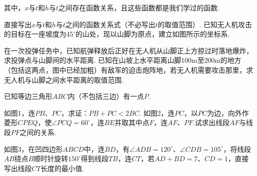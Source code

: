 \documentclass[10pt]{article}
\begin{document}
\begin{questions}{\answeringintroduction}
\begin{figure}[!htb]
{}
    \end{figure}
    \par 其中，$x$与$t$和$h$与$t$之间存在函数关系，且这些函数都是我们学过的函数.
    \begin{subquestions}
        \subquestion 直接写出$x$与$t$和$h$与$t$之间的函数关系式（不必写出$t$的取值范围）.
        \subquestion 已知无人机攻击的目标在一座坡度为$45^{\circ}$的山处，现以山脚为原点，建立如图所示的坐标系.
        \begin{subsubquestions}
            \subsubquestion 在一次投弹任务中，已知航弹释放后正好在无人机从山脚正上方掠过时落地爆炸，求投弹点与山脚间的水平距离.
            \subsubquestion 已知在山坡上水平距离山脚$100$m至$200$m的地方（包括这两点，图中已经加粗）有敌军的迫击炮阵地，若无人机需要攻击那里，求无人机与山脚之间水平距离的取值范围.
        \end{subsubquestions}
    \end{subquestions}
    \newpage
    \question %
    \begin{subquestions}
        \subquestion 已知等边三角形$ABC$内（不包括三边）有一点$P$.
        \begin{subsubquestions}
            \subsubquestion 如图1，连$PB$、$PC$，求证：$PB+PC<2BC$.
            \subsubquestion 如图2，连$PC$，以$PC$为边，向外作菱形$CPEQ$，使$\angle PCQ=60^{\circ}$，连$BE$并取其中点$F$，连$AF$、$PF$.试求出线段$AF$与线段$PF$之间的关系.
        \end{subsubquestions}
        \subquestion 如图3，在凹四边形$ABCD$中，连$BD$，有$\angle ADB=120^{\circ}$、$\angle CDB=105^{\circ}$，将线段$AB$绕点$B$顺时针旋转$150^{\circ}$得到线段$TB$，连$CT$，若$AD+BD=7$、$CD=1$，直接写出线段$CT$长度的最小值.
    \end{subquestions}
    \begin{figure}[!htb]
        \centering
\end{figure}
\end{questions}
\end{document}
